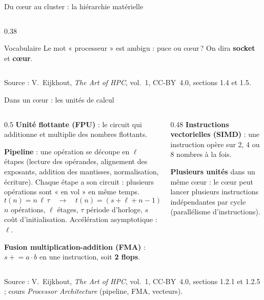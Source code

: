 \documentclass[8pt,aspectratio=169]{beamer}
\newcommand{\src}[1]{\vfill{\tiny\color{gray}Source : #1\par}}
\newcommand{\eij}{V.~Eijkhout, \emph{The Art of HPC}, vol.~1, CC-BY~4.0}
\begin{document}
\begin{frame}{Du cœur au cluster : la hiérarchie matérielle}
\begin{columns}[T]
\begin{column}{0.38\textwidth}
\medskip
\begin{alertblock}{Vocabulaire}
Le mot « processeur » est ambigu : puce ou cœur\,? On dira \textbf{socket} et \textbf{cœur}.
\end{alertblock}
\end{column}
\end{columns}
\src{\eij{}, sections 1.4 et 1.5.}
\end{frame}

\begin{frame}{Dans un cœur : les unités de calcul}
\begin{columns}[T]
\begin{column}{0.5\textwidth}
\textbf{Unité flottante (FPU)} : le circuit qui additionne et multiplie des nombres flottants.

\medskip
\textbf{Pipeline} : une opération se découpe en $\ell$ étapes (lecture des opérandes, alignement des exposants, addition des mantisses, normalisation, écriture). Chaque étape a son circuit : plusieurs opérations sont « en vol » en même temps.
\[
t(n) = n\,\ell\,\tau \quad\longrightarrow\quad t(n) = (s+\ell+n-1)\,\tau
\]
$n$ opérations, $\ell$ étages, $\tau$ période d'horloge, $s$ coût d'initialisation. Accélération asymptotique : $\ell$.

\medskip
\textbf{Fusion multiplication-addition (FMA)} : $s \mathrel{+}= a\cdot b$ en une instruction, soit \textbf{2 flops}.
\end{column}
\begin{column}{0.48\textwidth}
\textbf{Instructions vectorielles (SIMD)} : une instruction opère sur 2, 4 ou 8 nombres à la fois.

\bigskip
\centering
{}

\medskip
\raggedright
\textbf{Plusieurs unités} dans un même cœur : le cœur peut lancer plusieurs instructions indépendantes par cycle (parallélisme d'instructions).
\end{column}
\end{columns}
\src{\eij{}, sections 1.2.1 et 1.2.5 ; cours \emph{Processor Architecture} (pipeline, FMA, vecteurs).}
\end{frame}
\end{document}
